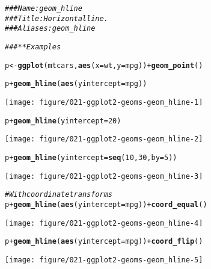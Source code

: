 \documentclass[a4paper,titlepage]{tufte-handout}\usepackage[]{graphicx}\usepackage[]{color}
\makeatletter
\def\maxwidth{ %
  \ifdim\Gin@nat@width>\linewidth
    \linewidth
  \else
    \Gin@nat@width
  \fi
}
\newcommand{\hlnum}[1]{\textcolor[rgb]{0.686,0.059,0.569}{#1}}%
\newcommand{\hlcom}[1]{\textcolor[rgb]{0.678,0.584,0.686}{\textit{#1}}}%
\newcommand{\hlopt}[1]{\textcolor[rgb]{0,0,0}{#1}}%
\newcommand{\hlstd}[1]{\textcolor[rgb]{0.345,0.345,0.345}{#1}}%
\newcommand{\hlkwb}[1]{\textcolor[rgb]{0.69,0.353,0.396}{#1}}%
\newcommand{\hlkwc}[1]{\textcolor[rgb]{0.333,0.667,0.333}{#1}}%
\newcommand{\hlkwd}[1]{\textcolor[rgb]{0.737,0.353,0.396}{\textbf{#1}}}%
\newenvironment{kframe}{%
 \def\at@end@of@kframe{}%
 \ifinner\ifhmode%
  \def\at@end@of@kframe{\end{minipage}}%
  \begin{minipage}{\columnwidth}%
 \fi\fi%
 \def\FrameCommand##1{\hskip\@totalleftmargin \hskip-\fboxsep
 \colorbox{shadecolor}{##1}\hskip-\fboxsep
     \hskip-\linewidth \hskip-\@totalleftmargin \hskip\columnwidth}%
 \MakeFramed {\advance\hsize-\width
   \@totalleftmargin\z@ \linewidth\hsize
   \@setminipage}}%
 {\par\unskip\endMakeFramed%
 \at@end@of@kframe}
\newenvironment{knitrout}{}{} %
\makeatother
\begin{document}
\begin{knitrout}
\color{fgcolor}\begin{kframe}
\begin{alltt}
\hlcom{### Name: geom_hline}
\hlcom{### Title: Horizontal line.}
\hlcom{### Aliases: geom_hline}

\hlcom{### ** Examples}

\hlstd{p} \hlkwb{<-} \hlkwd{ggplot}\hlstd{(mtcars,} \hlkwd{aes}\hlstd{(}\hlkwc{x} \hlstd{= wt,} \hlkwc{y}\hlstd{=mpg))} \hlopt{+} \hlkwd{geom_point}\hlstd{()}

\hlstd{p} \hlopt{+} \hlkwd{geom_hline}\hlstd{(}\hlkwd{aes}\hlstd{(}\hlkwc{yintercept}\hlstd{=mpg))}
\end{alltt}
\end{kframe}
\texttt{[image: figure/021-ggplot2-geoms-geom\_hline-1]} 
\begin{kframe}\begin{alltt}
\hlstd{p} \hlopt{+} \hlkwd{geom_hline}\hlstd{(}\hlkwc{yintercept}\hlstd{=}\hlnum{20}\hlstd{)}
\end{alltt}
\end{kframe}
\texttt{[image: figure/021-ggplot2-geoms-geom\_hline-2]} 
\begin{kframe}\begin{alltt}
\hlstd{p} \hlopt{+} \hlkwd{geom_hline}\hlstd{(}\hlkwc{yintercept}\hlstd{=}\hlkwd{seq}\hlstd{(}\hlnum{10}\hlstd{,} \hlnum{30}\hlstd{,} \hlkwc{by}\hlstd{=}\hlnum{5}\hlstd{))}
\end{alltt}
\end{kframe}
\texttt{[image: figure/021-ggplot2-geoms-geom\_hline-3]} 
\begin{kframe}\begin{alltt}
\hlcom{# With coordinate transforms}
\hlstd{p} \hlopt{+} \hlkwd{geom_hline}\hlstd{(}\hlkwd{aes}\hlstd{(}\hlkwc{yintercept}\hlstd{=mpg))} \hlopt{+} \hlkwd{coord_equal}\hlstd{()}
\end{alltt}
\end{kframe}
\texttt{[image: figure/021-ggplot2-geoms-geom\_hline-4]} 
\begin{kframe}\begin{alltt}
\hlstd{p} \hlopt{+} \hlkwd{geom_hline}\hlstd{(}\hlkwd{aes}\hlstd{(}\hlkwc{yintercept}\hlstd{=mpg))} \hlopt{+} \hlkwd{coord_flip}\hlstd{()}
\end{alltt}
\end{kframe}
\texttt{[image: figure/021-ggplot2-geoms-geom\_hline-5]} 

\end{knitrout}
\end{document}
